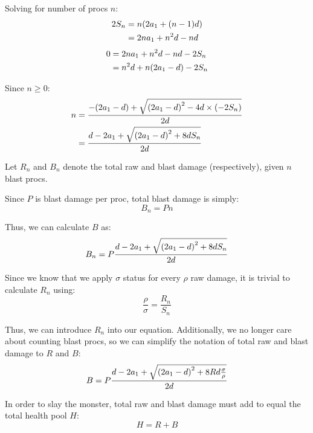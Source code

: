 \documentclass{article}
\begin{document}
Solving for number of procs $n$:
\begin{align}
    2 S_n &= n \parens*{2 a_1 + \parens*{n - 1} d} \\
          &= 2 n a_1 + n^2 d - n d
\end{align}
\begin{align}
    0 &= 2 n a_1 + n^2 d - n d - 2 S_n \\
      &= n^2 d + n \parens*{2 a_1 - d} - 2 S_n
\end{align}

Since $n \ge 0$:
\begin{align}
    n &= \frac{- \parens*{2 a_1 - d} + \sqrt{\parens*{2 a_1 - d}^2 - 4 d \times \parens*{- 2 S_n}}}{2 d} \\
      &= \frac{d - 2 a_1 + \sqrt{\parens*{2 a_1 - d}^2 + 8 d S_n}}{2 d}
\end{align}

Let $R_n$ and $B_n$ denote the total raw and blast damage (respectively), given $n$ blast procs.

Since $P$ is blast damage per proc, total blast damage is simply:
\begin{equation}
    B_n = Pn
\end{equation}

Thus, we can calculate $B$ as:
\begin{equation}
    B_n = P \frac{d - 2 a_1 + \sqrt{\parens*{2 a_1 - d}^2 + 8 d S_n}}{2 d}
\end{equation}

Since we know that we apply $\sigma$ status for every $\rho$ raw damage, it is trivial to calculate $R_n$ using:
\begin{equation}
    \frac{\rho}{\sigma} = \frac{R_n}{S_n}
    \label{eq:rs_ratio}
\end{equation}

Thus, we can introduce $R_n$ into our equation. Additionally, we no longer care about counting blast procs, so we can simplify the notation of total raw and blast damage to $R$ and $B$:
\begin{equation}
    B = P \frac{d - 2 a_1 + \sqrt{\parens*{2 a_1 - d}^2 + 8 R d \frac{\sigma}{\rho} }}{2 d}
\end{equation}

In order to slay the monster, total raw and blast damage must add to equal the total health pool $H$:
\begin{equation}
    H = R + B
    \label{eq:h_eq_r_b}
\end{equation}
\end{document}
